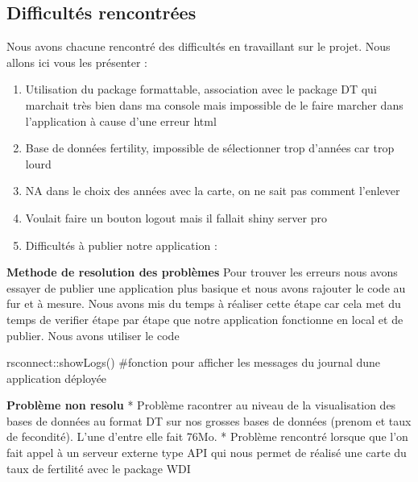 \documentclass[
]{article}
\newenvironment{Shaded}{}{}
\newcommand{\CommentTok}[1]{\textcolor[rgb]{0.00,0.50,0.00}{#1}}
\newcommand{\FunctionTok}[1]{#1}
\newcommand{\NormalTok}[1]{#1}
\newcommand{\SpecialCharTok}[1]{\textcolor[rgb]{0.00,0.50,0.50}{#1}}
\providecommand{\tightlist}{%
  \setlength{\itemsep}{0pt}\setlength{\parskip}{0pt}}
\begin{document}
\hypertarget{difficultuxe9s-rencontruxe9es}{%
\subsection{Difficultés
rencontrées}\label{difficultuxe9s-rencontruxe9es}}

Nous avons chacune rencontré des difficultés en travaillant sur le
projet. Nous allons ici vous les présenter :

\begin{enumerate}
\def\labelenumi{\arabic{enumi}.}
\tightlist
\item
  Utilisation du package formattable, association avec le package DT qui
  marchait très bien dans ma console mais impossible de le faire marcher
  dans l'application à cause d'une erreur html
\item
  Base de données fertility, impossible de sélectionner trop d'années
  car trop lourd
\item
  NA dans le choix des années avec la carte, on ne sait pas comment
  l'enlever
\item
  Voulait faire un bouton logout mais il fallait shiny server pro
\item
  Difficultés à publier notre application :
\end{enumerate}

\textbf{Methode de resolution des problèmes} Pour trouver les erreurs
nous avons essayer de publier une application plus basique et nous avons
rajouter le code au fur et à mesure. Nous avons mis du temps à réaliser
cette étape car cela met du temps de verifier étape par étape que notre
application fonctionne en local et de publier. Nous avons utiliser le
code

\begin{Shaded}
\begin{Highlighting}[]
\NormalTok{rsconnect}\SpecialCharTok{::}\FunctionTok{showLogs}\NormalTok{() }\CommentTok{\#fonction pour afficher les messages du journal d\textquotesingle{}une application déployée}
\end{Highlighting}
\end{Shaded}

\textbf{Problème non resolu} * Problème racontrer au niveau de la
visualisation des bases de données au format DT sur nos grosses bases de
données (prenom et taux de fecondité). L'une d'entre elle fait 76Mo. *
Problème rencontré lorsque que l'on fait appel à un serveur externe type
API qui nous permet de réalisé une carte du taux de fertilité avec le
package WDI
\end{document}
